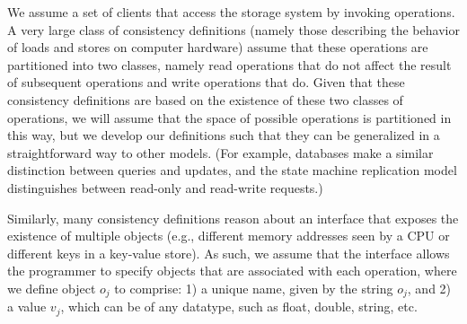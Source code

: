 \documentclass{sig-alternate-05-2015}
\begin{document}
We assume a set of clients that access the storage system by invoking operations. A very large class of consistency definitions (namely those describing the behavior of loads and stores on computer hardware) assume that these operations are partitioned into two classes, namely read operations that do not affect the result of subsequent operations and write operations that do. Given that these consistency definitions are based on the existence of these two classes of operations, we will assume that the space of possible operations is partitioned in this way, but we develop our definitions such that they can be generalized in a straightforward way to other models. (For example, databases make a similar distinction between queries and updates, and the state machine replication model distinguishes between read-only and read-write requests.)

Similarly, many consistency definitions reason about an interface that exposes the existence of multiple objects (e.g., different memory addresses seen by a CPU or different keys in a key-value store). As such, we assume that the interface allows the programmer to specify objects that are associated with each operation, where we define object $o_j$ to comprise: 1) a unique name, given by the string $o_j$, and 2) a value $v_j$, which can be of any datatype, such as float, double, string, etc. %
\end{document}
